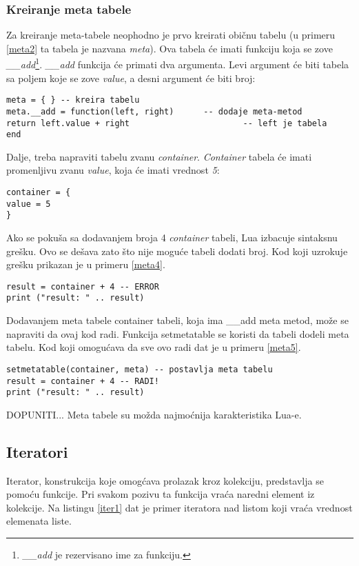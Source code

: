 \documentclass[a4paper]{article}
\begin{document}
\subsubsection*{Kreiranje meta tabele}
Za kreiranje meta-tabele neophodno je prvo kreirati običnu tabelu (u primeru \ref{meta2} ta tabela je nazvana \textit{meta}). Ova tabela će imati funkciju koja se zove \textit{\_\_add}\footnote{\textit{\_\_add} je rezervisano ime za funkciju.}. \textit{\_\_add} funkcija će primati dva argumenta. Levi argument će biti tabela sa poljem koje se zove \textit{value}, a desni argument će biti broj:
\begin{lstlisting}[caption={Metatabela},frame=single, label=meta2]
meta = { } -- kreira tabelu
meta.__add = function(left, right)		-- dodaje meta-metod
return left.value + right 						-- left je tabela
end
\end{lstlisting}
Dalje, treba napraviti tabelu zvanu \textit{container}. \textit{Container} tabela će imati promenljivu zvanu \textit{value}, koja će imati vrednost \textit{5}:
\begin{lstlisting}[caption={Kreiranje meta-tabele},frame=single, label=meta3]
container = {
value = 5
}
\end{lstlisting}
Ako se pokuša sa dodavanjem broja 4 \textit{container} tabeli, Lua izbacuje sintaksnu grešku. Ovo se dešava zato što nije moguće tabeli dodati broj. Kod koji uzrokuje grešku prikazan je u primeru \ref{meta4}.
\begin{lstlisting}[caption={Neispravno sabiranje tabele i broja},frame=single, label=meta4]
result = container + 4 -- ERROR
print ("result: " .. result)
\end{lstlisting}
Dodavanjem meta tabele container tabeli, koja ima \_\_add meta metod, može se napraviti da ovaj kod radi. Funkcija setmetatable se koristi da tabeli dodeli meta tabelu. Kod koji omogućava da sve ovo radi dat je u primeru \ref{meta5}.
\begin{lstlisting}[caption={Metatabela},frame=single, label=meta5]
setmetatable(container, meta) -- postavlja meta tabelu
result = container + 4 -- RADI!
print ("result: " .. result)
\end{lstlisting}
DOPUNITI... Meta tabele su možda najmoćnija karakteristika Lua-e.


\subsection*{Iteratori}

Iterator, konstrukcija koje omogćava prolazak kroz kolekciju, predstavlja se pomoću funkcije. Pri svakom pozivu ta funkcija vraća naredni element iz kolekcije. Na listingu \ref{iter1} dat je primer iteratora nad listom koji vraća vrednost elemenata liste.
\end{document}
